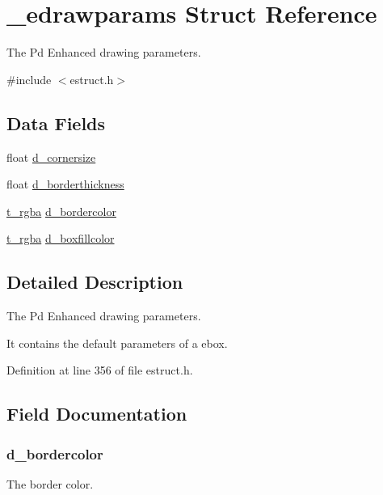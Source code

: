\hypertarget{struct__edrawparams}{\section{\-\_\-edrawparams Struct Reference}
\label{struct__edrawparams}
}


The Pd Enhanced drawing parameters.  




{\ttfamily \#include $<$estruct.\-h$>$}

\subsection*{Data Fields}
\begin{DoxyCompactItemize}
\item 
float \hyperlink{struct__edrawparams_aabe78053b56e3bf3df55c7b85fa251b2}{d\-\_\-cornersize}
\item 
float \hyperlink{struct__edrawparams_a9c360cb962f79a835ed0457d1dad34b5}{d\-\_\-borderthickness}
\item 
\hyperlink{struct__rgba}{t\-\_\-rgba} \hyperlink{struct__edrawparams_af4ac3d463e5738bdbf0c2bbf15be9ae3}{d\-\_\-bordercolor}
\item 
\hyperlink{struct__rgba}{t\-\_\-rgba} \hyperlink{struct__edrawparams_aaf0259436a4f71d6659c0447e4b98e2b}{d\-\_\-boxfillcolor}
\end{DoxyCompactItemize}


\subsection{Detailed Description}
The Pd Enhanced drawing parameters. 

It contains the default parameters of a ebox. 

Definition at line 356 of file estruct.\-h.



\subsection{Field Documentation}
\hypertarget{struct__edrawparams_af4ac3d463e5738bdbf0c2bbf15be9ae3}{
\subsubsection[{d\-\_\-bordercolor}]{ d\-\_\-bordercolor}}\label{struct__edrawparams_af4ac3d463e5738bdbf0c2bbf15be9ae3}
The border color. 

